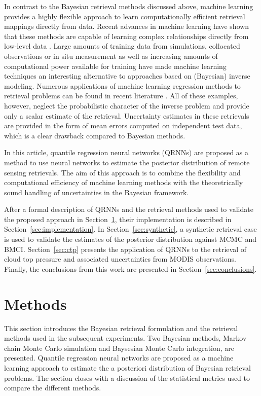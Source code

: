 \documentclass[journal abbreviation, manuscript]{copernicus}
\begin{document}
In contrast to the Bayesian retrieval methods discussed above, machine learning
provides a highly flexible approach to learn computationally efficient retrieval
mappings directly from data. Recent advances in machine learning have shown that
these methods are capable of learning complex relationships directly from
low-level data \citep{lecun}. Large amounts of training data from simulations,
collocated observations or in situ measurement as well as increasing amounts of
computational power available for training have made machine learning techniques
an interesting alternative to approaches based on (Bayesian) inverse modeling.
Numerous applications of machine learning regression methods to retrieval
problems can be found in recent literature \citep{holl, strandgren, hakansson}.
All of these examples, however, neglect the probabilistic character of the
inverse problem and provide only a scalar estimate of the retrieval. Uncertainty
estimates in these retrievals are provided in the form of mean errors
computed on independent test data, which is a clear drawback compared to
Bayesian methods.

In this article, quantile regression neural networks (QRNNs) are proposed as a
method to use neural networks to estimate the posterior distribution of
remote sensing retrievals. The aim of this approach is to combine the
flexibility and computational efficiency of machine learning methods with the
theoretrically sound handling of uncertainties in the Bayesian framework. 

After a formal description of QRNNs and the retrieval methods used to validate
the proposed approach in Section~\ref{sec:methods}, their implementation is
described in Section~\ref{sec:implementation}. In Section~\ref{sec:synthetic}, a
synthetic retrieval case is used to validate the estimates of the posterior
distribution against MCMC and BMCI. Section~\ref{sec:ctp} presents the
application of QRNNs to the retrieval of cloud top pressure and associated
uncertainties from MODIS observations. Finally, the conclusions from this
work are presented in Section~\ref{sec:conclusions}.

\section{Methods}
\label{sec:methods}

This section introduces the Bayesian retrieval formulation and the retrieval
methods used in the subsequent experiments. Two Bayesian methods, Markov chain
Monte Carlo simulation and Baysesian Monte Carlo integration, are presented.
Quantile regression neural networks are proposed as a machine learning approach
to estimate the a posteriori distribution of Bayesian retrieval problems. The
section closes with a discussion of the statistical metrics used to compare the
different methods.
\end{document}
